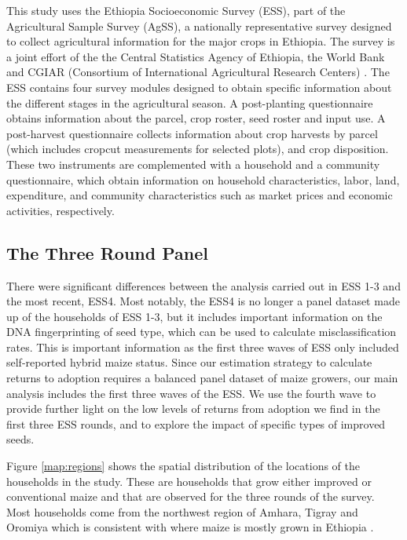 \documentclass[11pt]{article}
\begin{document}
This study uses the Ethiopia Socioeconomic Survey (ESS), part of the Agricultural Sample Survey (AgSS), a nationally representative survey designed to collect agricultural information for the major crops in Ethiopia. The survey is a joint effort of the the Central Statistics Agency of Ethiopia, the World Bank and CGIAR (Consortium of International Agricultural Research Centers) \citep{kosmowski2020shining}. The ESS contains four survey modules designed to obtain specific information about the different stages in the agricultural season. A post-planting questionnaire obtains information about the parcel, crop roster, seed roster and input use. A post-harvest questionnaire collects information about crop harvests by parcel (which includes cropcut measurements for selected plots), and crop disposition. These two instruments are complemented with a household and a community questionnaire, which obtain information on household characteristics, labor, land, expenditure, and community characteristics such as market prices and economic activities, respectively.

\subsection{The Three Round Panel}

There were significant differences between the analysis carried out in ESS 1-3 and the most recent, ESS4. Most notably, the ESS4 is no longer a panel dataset made up of the households of ESS 1-3, but it includes important information on the DNA fingerprinting of seed type, which can be used to calculate misclassification rates. This is important information as the first three waves of ESS only included self-reported hybrid maize status. Since our estimation strategy to calculate returns to adoption requires a balanced panel dataset of maize growers, our main analysis includes the first three waves of the ESS. We use the fourth wave to provide further light on the low levels of returns from adoption we find in the first three ESS rounds, and to explore the impact of specific types of improved seeds.

Figure \ref{map:regions} shows the spatial distribution of the locations of the households in the study. These are households that grow either improved or conventional maize and that are observed for the three rounds of the survey. Most households come from the northwest region of Amhara, Tigray and Oromiya which is consistent with where maize is mostly grown in Ethiopia \citep{Abate2015-rj}.
\end{document}
